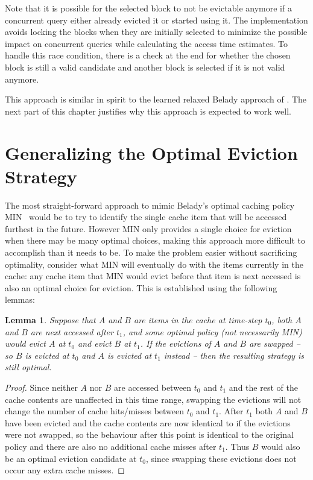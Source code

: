 Note that it is possible for the selected block to not be evictable anymore if a concurrent query either already evicted it or started using it. The implementation avoids locking the blocks when they are initially selected to minimize the possible impact on concurrent queries while calculating the access time estimates. To handle this race condition, there is a check at the end for whether the chosen block is still a valid candidate and another block is selected if it is not valid anymore.

This approach is similar in spirit to the learned relaxed Belady approach of \citet{relaxedBelady}. The next part of this chapter justifies why this approach is expected to work well.


\section{Generalizing the Optimal Eviction Strategy}
\label{sec:generalized-MIN}

The most straight-forward approach to mimic Belady's optimal caching policy MIN~\cite{beladyMIN} would be to try to identify the single cache item that will be accessed furthest in the future. However MIN only provides a single choice for eviction when there may be many optimal choices, making this approach more difficult to accomplish than it needs to be. To make the problem easier without sacrificing optimality, consider what MIN will eventually do with the items currently in the cache: any cache item that MIN would evict before that item is next accessed is also an optimal choice for eviction. This is established using the following lemmas:

\newtheorem{claim}{Lemma}

\begin{claim}\label{lemma:swap-opt}
Suppose that $A$ and $B$ are items in the cache at time-step $t_0$, both $A$ and $B$ are next accessed after $t_1$, and some optimal policy (not necessarily MIN) would evict $A$ at $t_0$ and evict $B$ at $t_1$. If the evictions of $A$ and $B$ are swapped -- so $B$ is evicted at $t_0$ and $A$ is evicted at $t_1$ instead -- then the resulting strategy is still optimal.
\end{claim}

\begin{proof}
Since neither $A$ nor $B$ are accessed between $t_0$ and $t_1$ and the rest of the cache contents are unaffected in this time range, swapping the evictions will not change the number of cache hits/misses between $t_0$ and $t_1$. After $t_1$ both $A$ and $B$ have been evicted and the cache contents are now identical to if the evictions were not swapped, so the behaviour after this point is identical to the original policy and there are also no additional cache misses after $t_1$. Thus $B$ would also be an optimal eviction candidate at $t_0$, since swapping these evictions does not occur any extra cache misses.
\end{proof}

